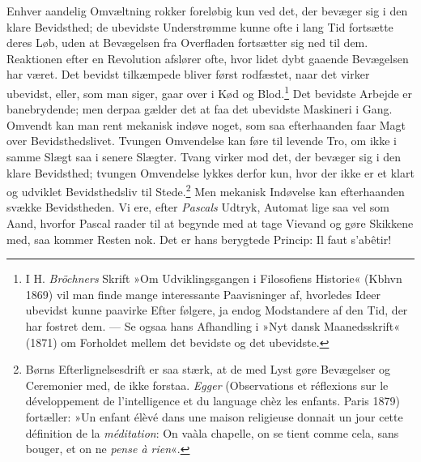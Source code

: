\documentclass[12pt,a4paper,openany]{book}
\newcommand{\opage}[1]{\marginnote{\footnotesize\textit{[#1]}}}
\begin{document}
Enhver aandelig Omvæltning rokker foreløbig kun ved det, der bevæger sig
i den klare Bevidsthed; de ubevidste Understrømme kunne ofte i lang Tid
fortsætte deres Løb, uden at Bevægelsen fra Overfladen fortsætter sig
ned til dem. Reaktionen efter en Revolution afslører ofte, hvor lidet
dybt gaaende Bevægelsen har været. Det bevidst tilkæmpede bliver først
rodfæstet, naar det virker ubevidst, eller, som man siger, gaar over i
Kød og Blod.\footnote[1]{I H. \emph{Bröchners} Skrift »Om
Udviklingsgangen i Filosofiens Historie« (Kbhvn 1869) vil man finde
mange interessante Paavisninger af, hvorledes Ideer ubevidst kunne
paavirke Efter følgere, ja endog Modstandere af den Tid, der har fostret
dem. --- Se ogsaa hans Afhandling i »Nyt dansk Maanedsskrift« (1871) om
Forholdet mellem det bevidste og det ubevidste.} Det bevidste Arbejde er
banebrydende; men derpaa gælder det at faa det ubevidste Maskineri i
Gang. Omvendt kan man rent mekanisk indøve noget, som saa efterhaanden
faar Magt over Bevidsthedslivet. Tvungen Omvendelse kan føre til levende
Tro, om ikke i samme Slægt saa i senere Slægter. Tvang virker mod det,
der bevæger sig i den klare Bevidsthed; tvungen Omvendelse lykkes derfor
kun, hvor der ikke er et klart og udviklet Bevidsthedsliv til
Stede.\footnote[2]{Børns Efterlignelsesdrift er saa stærk, at de med
Lyst gøre Bevægelser og Ceremonier med, de ikke forstaa. \emph{Egger}
(Observations et réflexions sur le développement de l’intelligence et du
language chèz les enfants. Paris 1879) fortæller: »Un enfant élèvé dans
une maison religieuse donnait un jour cette définition de la
\emph{méditation}: On vaàla chapelle, on se tient comme cela, sans
bouger, et on ne \emph{pense à rien}«.} Men mekanisk Indøvelse kan
efterhaanden svække Bevidstheden.
\opage{91}Vi ere, efter \emph{Pascals} Udtryk, Automat lige saa vel som
Aand, hvorfor Pascal raader til at begynde med at tage Vievand og gøre
Skikkene med, saa kommer Resten nok. Det er hans berygtede Princip: Il
faut s’abêtir!
\end{document}
